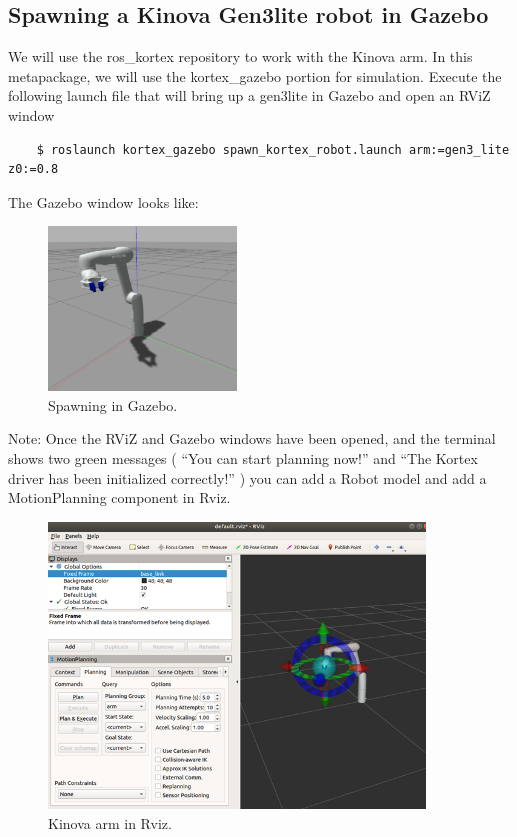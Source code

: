 \documentclass[12pt]{article}
\begin{document}
\subsection{Spawning a Kinova Gen3lite robot in Gazebo}

We will use the ros\_kortex repository to work with the Kinova arm. In this metapackage, we will use the kortex\_gazebo portion for simulation. Execute the following launch file that will bring up a gen3lite in Gazebo and open an RViZ window
\begin{verbatim}
    $ roslaunch kortex_gazebo spawn_kortex_robot.launch arm:=gen3_lite z0:=0.8
    \end{verbatim}

The Gazebo window looks like:

\begin{figure}[H]
    \vspace{-10pt}
    \centering\includegraphics[width=5cm]{images/gazebo.PNG}\vspace{-10pt}
    \caption{Spawning in Gazebo.}\label{fig:gazebo}
    \end{figure}

Note: Once the RViZ and Gazebo windows have been opened, and the terminal shows two green messages ( “You can start planning now!” and “The Kortex driver has been initialized correctly!” ) you can add a Robot model and add a MotionPlanning component in Rviz.

\begin{figure}[H]
    \vspace{-10pt}
    \centering\includegraphics[width=10cm]{images/rviz1.png}\vspace{-10pt}
    \caption{Kinova arm in Rviz.}\label{fig:rviz1}
    \end{figure}
\end{document}
